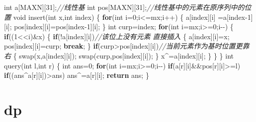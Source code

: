\documentclass[
]{article}
\newenvironment{Shaded}{}{}
\newcommand{\CommentTok}[1]{\textcolor[rgb]{0.38,0.63,0.69}{\textit{#1}}}
\newcommand{\ControlFlowTok}[1]{\textcolor[rgb]{0.00,0.44,0.13}{\textbf{#1}}}
\newcommand{\DataTypeTok}[1]{\textcolor[rgb]{0.56,0.13,0.00}{#1}}
\newcommand{\DecValTok}[1]{\textcolor[rgb]{0.25,0.63,0.44}{#1}}
\newcommand{\NormalTok}[1]{#1}
\begin{document}
\begin{Shaded}
\begin{Highlighting}[]
\DataTypeTok{int}\NormalTok{ a[MAXN][}\DecValTok{31}\NormalTok{];}\CommentTok{//线性基}
\DataTypeTok{int}\NormalTok{ pos[MAXN][}\DecValTok{31}\NormalTok{];}\CommentTok{//线性基中的元素在原序列中的位置}
\DataTypeTok{void}\NormalTok{ insert(}\DataTypeTok{int}\NormalTok{ x,}\DataTypeTok{int}\NormalTok{ index)}
\NormalTok{\{}
    \ControlFlowTok{for}\NormalTok{(}\DataTypeTok{int}\NormalTok{ i=}\DecValTok{0}\NormalTok{;i\textless{}=mx;i++)}
\NormalTok{    \{}
\NormalTok{        a[index][i]  =a[index{-}}\DecValTok{1}\NormalTok{][i];}
\NormalTok{        pos[index][i]=pos[index{-}}\DecValTok{1}\NormalTok{][i];}
\NormalTok{    \}}
    \DataTypeTok{int}\NormalTok{ curp=index;}
    \ControlFlowTok{for}\NormalTok{(}\DataTypeTok{int}\NormalTok{ i=mx;i\textgreater{}=}\DecValTok{0}\NormalTok{;i{-}{-})}
\NormalTok{    \{}
        \ControlFlowTok{if}\NormalTok{((}\DecValTok{1}\NormalTok{\textless{}\textless{}i)\&x)}
\NormalTok{        \{}
            \ControlFlowTok{if}\NormalTok{(!a[index][i])}\CommentTok{//该位上没有元素 直接插入}
\NormalTok{            \{}
\NormalTok{                a[index][i]=x;}
\NormalTok{                pos[index][i]=curp;}
                \ControlFlowTok{break}\NormalTok{;}
\NormalTok{            \}}
            \ControlFlowTok{if}\NormalTok{(curp\textgreater{}pos[index][i])}\CommentTok{//当前元素作为基时位置更靠右}
\NormalTok{            \{}
\NormalTok{                swap(x,a[index][i]);}
\NormalTok{                swap(curp,pos[index][i]);}
\NormalTok{            \}}
\NormalTok{            x\^{}=a[index][i];}
\NormalTok{        \}}
\NormalTok{    \}}
\NormalTok{\}}
\DataTypeTok{int}\NormalTok{ query(}\DataTypeTok{int}\NormalTok{ l,}\DataTypeTok{int}\NormalTok{ r)}
\NormalTok{\{}
    \DataTypeTok{int}\NormalTok{ ans=}\DecValTok{0}\NormalTok{;}
    \ControlFlowTok{for}\NormalTok{(}\DataTypeTok{int}\NormalTok{ i=mx;i\textgreater{}=}\DecValTok{0}\NormalTok{;i{-}{-})}
        \ControlFlowTok{if}\NormalTok{(a[r][i]\&\&pos[r][i]\textgreater{}=l)}
            \ControlFlowTok{if}\NormalTok{((ans\^{}a[r][i])\textgreater{}ans)}
\NormalTok{                ans\^{}=a[r][i];}
    \ControlFlowTok{return}\NormalTok{ ans;}
\NormalTok{\}}
\end{Highlighting}
\end{Shaded}

\hypertarget{dp}{%
\section{dp}\label{dp}}
\end{document}
